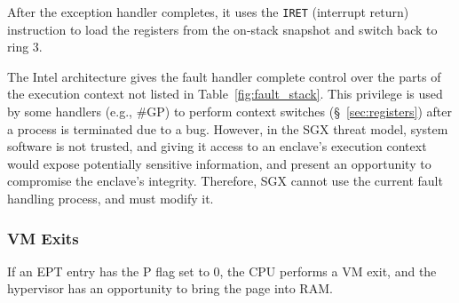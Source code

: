 After the exception handler completes, it uses the \texttt{IRET} (interrupt
return) instruction to load the registers from the on-stack snapshot and switch
back to ring 3.

The Intel architecture gives the fault handler complete control over the parts
of the execution context not listed in Table~\ref{fig:fault_stack}. This
privilege is used by some handlers (e.g., \#GP) to perform context switches
(\S~\ref{sec:registers}) after a process is terminated due to a bug. However,
in the SGX threat model, system software is not trusted, and giving it access
to an enclave's execution context would expose potentially sensitive
information, and present an opportunity to compromise the enclave's integrity.
Therefore, SGX cannot use the current fault handling process, and must modify
it.


\subsubsection{VM Exits}
\label{sec:vm_exits}

If an EPT entry has the P flag set to 0, the CPU performs a VM exit, and the
hypervisor has an opportunity to bring the page into RAM.





